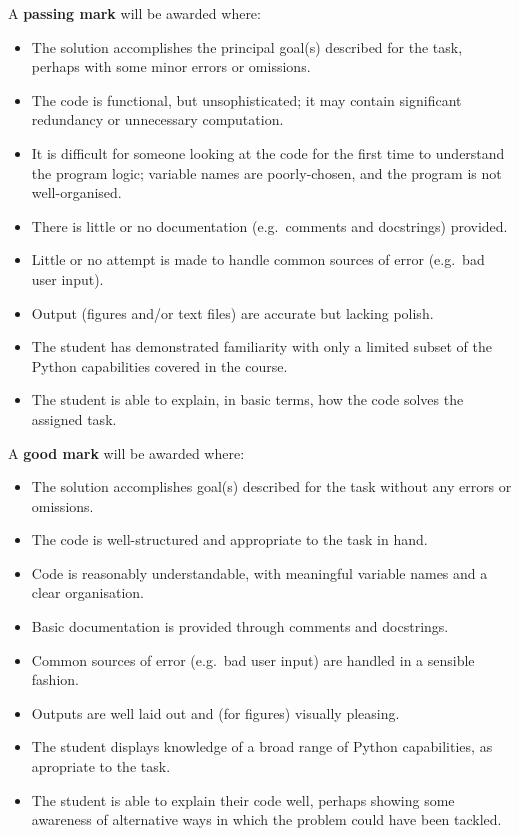 \documentclass[11pt]{article}
\begin{document}
A \textbf{passing mark} will be awarded where:

\begin{itemize}
\item
  The solution accomplishes the principal goal(s) described for the
  task, perhaps with some minor errors or omissions.
\item
  The code is functional, but unsophisticated; it may contain
  significant redundancy or unnecessary computation.
\item
  It is difficult for someone looking at the code for the first time to
  understand the program logic; variable names are poorly-chosen, and
  the program is not well-organised.
\item
  There is little or no documentation (e.g.~comments and docstrings)
  provided.
\item
  Little or no attempt is made to handle common sources of error
  (e.g.~bad user input).
\item
  Output (figures and/or text files) are accurate but lacking polish.
\item
  The student has demonstrated familiarity with only a limited subset of
  the Python capabilities covered in the course.
\item
  The student is able to explain, in basic terms, how the code solves
  the assigned task.
\end{itemize}

A \textbf{good mark} will be awarded where:

\begin{itemize}
\item
  The solution accomplishes goal(s) described for the task without any
  errors or omissions.
\item
  The code is well-structured and appropriate to the task in hand.
\item
  Code is reasonably understandable, with meaningful variable names and
  a clear organisation.
\item
  Basic documentation is provided through comments and docstrings.
\item
  Common sources of error (e.g.~bad user input) are handled in a
  sensible fashion.
\item
  Outputs are well laid out and (for figures) visually pleasing.
\item
  The student displays knowledge of a broad range of Python
  capabilities, as apropriate to the task.
\item
  The student is able to explain their code well, perhaps showing some
  awareness of alternative ways in which the problem could have been
  tackled.
\end{itemize}
\end{document}
